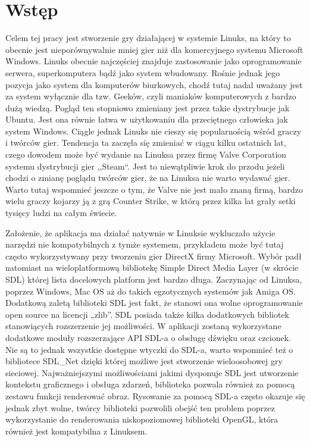 \setcounter{secnumdepth}{-1}
\renewcommand{\chaptername}{}
\chapter{Wstęp} 
\hspace{1cm} Celem tej pracy jest stworzenie gry działającej w systemie Linuks, na który to obecnie jest nieporównywalnie mniej gier niż dla komercyjnego systemu Microsoft Windows. Linuks obecnie najczęściej znajduje zastosowanie jako oprogramowanie serwera, superkomputera bądź jako system wbudowany. Rośnie jednak jego pozycja jako system dla komputerów biurkowych, chodź tutaj nadal uważany jest za system wyłącznie dla tzw. Geeków, czyli maniaków komputerowych z bardzo dużą wiedzą. Pogląd ten stopniowo zmieniany jest przez takie dystrybucje jak Ubuntu. Jest ona równie łatwa w użytkowaniu dla przeciętnego człowieka jak system Windows. Ciągle jednak Linuks nie cieszy się popularnością wśród graczy i twórców gier. Tendencja ta zaczęła się zmieniać w ciągu kilku ostatnich lat, czego dowodem może być wydanie na Linuksa przez firmę Valve Corporation systemu dystrybucji gier ,,Steam``. Jest to niewątpliwie krok do przodu jeżeli chodzi o zmianę poglądu twórców gier, że na Linuksa nie warto wydawać gier. Warto tutaj wspomnieć jeszcze o tym, że Valve nie jest mało znaną firmą, bardzo wielu graczy kojarzy ją z grą Counter Strike, w którą przez kilka lat grały setki tysięcy ludzi na całym świecie.

Założenie, że aplikacja ma działać natywnie w Linuksie wykluczało użycie narzędzi nie kompatybilnych z tymże systemem, przykładem może być tutaj często wykorzystywany przy tworzeniu gier DirectX firmy Microsoft. Wybór padł natomiast na wieloplatformową bibliotekę Simple Direct Media Layer (w skrócie SDL) której lista docelowych platform jest bardzo długa.
Zaczynając od Linuksa, poprzez Windows, Mac OS aż do takich egzotycznych systemów jak Amiga OS. Dodatkową zaletą biblioteki SDL jest fakt, że stanowi ona wolne oprogramowanie open source na licencji „zlib”. SDL posiada także kilka dodatkowych bibliotek stanowiących rozszerzenie jej możliwości. W aplikacji zostaną wykorzystane dodatkowe moduły rozszerzające API SDL-a o obsługę
dźwięku oraz czcionek. Nie są to jednak wszystkie dostępne wtyczki do SDL-a, warto wspomnieć też o bibliotece SDL\_Net dzięki której możliwe jest stworzenie wieloosobowej  gry sieciowej. Najważniejszymi możliwościami jakimi dysponuje SDL jest utworzenie kontekstu graficznego i obsługa zdarzeń, biblioteka pozwala również za pomocą zestawu funkcji renderować obraz. Rysowanie za pomocą SDL-a często okazuje się jednak zbyt wolne, twórcy biblioteki pozwolili obejść ten problem poprzez wykorzystanie do renderowania 
niskopoziomowej biblioteki OpenGL, która również jest kompatybilna z Linuksem.

